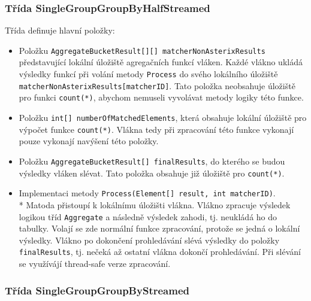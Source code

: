 \subsubsection{Třída SingleGroupGroupByHalfStreamed}

Třída definuje hlavní položky:
\begin{itemize}
\item Položku \texttt{AggregateBucketResult[][] matcherNonAsterixResults} představující lokální úložiště agregačních funkcí vláken.
Každé vlákno ukládá výsledky funkcí při volání metody \texttt{Process} do svého lokálního úložiště \texttt{matcherNonAsterixResults[matcherID]}.
Tato položka neobsahuje úložiště pro funkci \texttt{count(*)}, abychom nemuseli vyvolávat metody logiky této funkce.
\item Položku \texttt{int[] numberOfMatchedElements}, která obsahuje lokální úložiště pro výpočet funkce \texttt{count(*)}.
Vlákna tedy při zpracování této funkce vykonají pouze vykonají navýšení této položky.
\item Položku \texttt{AggregateBucketResult[] finalResults}, do kterého se budou výsledky vláken slévat.
Tato položka obsahuje již úložiště pro \texttt{count(*)}.
\item Implementaci metody \texttt{Process(Element[] result, int matcherID)}.\\*
Matoda přistoupí k lokálnímu úložišti vlákna.
Vlákno zpracuje výsledek logikou tříd \texttt{Aggregate} a následně výsledek zahodi, tj. neukládá ho do tabulky.
Volají se zde normální funkce zpracování, protože se jedná o lokální výsledky.
Vlákno po dokončení prohledávání slévá výsledky do položky \texttt{finalResults}, tj. nečeká až ostatní vlákna dokončí prohledávání.
Při slévání se využívájí thread-safe verze zpracování.
\end{itemize}

\subsubsection{Třída SingleGroupGroupByStreamed}

